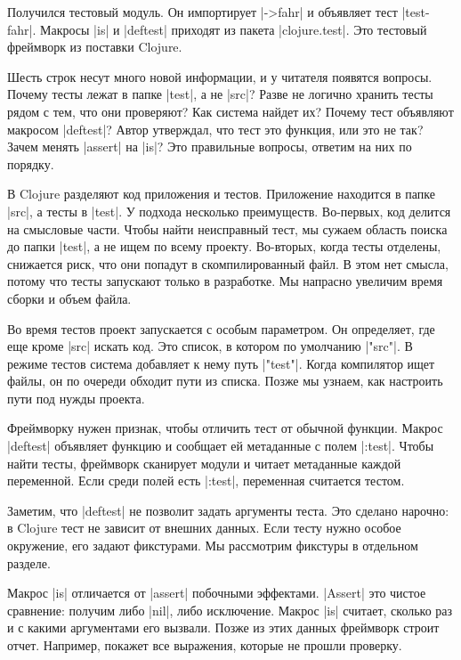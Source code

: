 Получился тестовый модуль. Он импортирует \spverb|->fahr| и объявляет тест
\spverb|test-fahr|. Макросы \spverb|is| и \spverb|deftest| приходят из пакета
\spverb|clojure.test|. Это тестовый фреймворк из поставки Clojure.

Шесть строк несут много новой информации, и у читателя появятся вопросы. Почему
тесты лежат в папке \spverb|test|, а не \spverb|src|? Разве не логично хранить
тесты рядом с тем, что они проверяют? Как система найдет их?  Почему тест
объявляют макросом \spverb|deftest|? Автор утверждал, что тест это функция, или
это не так? Зачем менять \spverb|assert| на \spverb|is|? Это правильные вопросы,
ответим на них по порядку.

В Clojure разделяют код приложения и тестов. Приложение находится в папке
\spverb|src|, а тесты в \spverb|test|. У подхода несколько
преимуществ. Во-первых, код делится на смысловые части. Чтобы найти неисправный
тест, мы сужаем область поиска до папки \spverb|test|, а не ищем по всему
проекту. Во-вторых, когда тесты отделены, снижается риск, что они попадут в
скомпилированный файл. В этом нет смысла, потому что тесты запускают только в
разработке. Мы напрасно увеличим время сборки и объем файла.

Во время тестов проект запускается с особым параметром. Он определяет, где еще
кроме \spverb|src| искать код. Это список, в котором по умолчанию
\spverb|"src"|. В режиме тестов система добавляет к нему путь
\spverb|"test"|. Когда компилятор ищет файлы, он по очереди обходит пути из
списка. Позже мы узнаем, как настроить пути под нужды проекта.

Фреймворку нужен признак, чтобы отличить тест от обычной функции. Макрос
\spverb|deftest| объявляет функцию и сообщает ей метаданные с полем
\spverb|:test|. Чтобы найти тесты, фреймворк сканирует модули и читает
метаданные каждой переменной. Если среди полей есть \spverb|:test|, переменная
считается тестом.

Заметим, что \spverb|deftest| не позволит задать аргументы теста. Это сделано
нарочно: в Clojure тест не зависит от внешних данных. Если тесту нужно особое
окружение, его задают фикстурами. Мы рассмотрим фикстуры в отдельном разделе.

Макрос \spverb|is| отличается от \spverb|assert| побочными
эффектами. \spverb|Assert| это чистое сравнение: получим либо \spverb|nil|, либо
исключение. Макрос \spverb|is| считает, сколько раз и с какими аргументами его
вызвали. Позже из этих данных фреймворк строит отчет. Например, покажет все
выражения, которые не прошли проверку.

